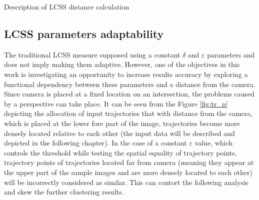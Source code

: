 \begin{algorithm}[!htb]
	\caption{Description of LCSS distance calculation}
	\label{algo:lcss-descr}
	\SetAlgoLined
\end{algorithm}

\subsection{LCSS parameters adaptability}

The traditional LCSS measure supposed using a constant $\delta$ and $\varepsilon$ parameters and does not imply making them adaptive. However, one of the objectives in this work is investigating an opportunity to increase results accuracy by exploring a functional dependency between these parameters and a distance from the camera. Since camera is placed at a fixed location on an intersection, the problems caused by a perspective can take place. It can be seen from the Figure \ref{fig:tr_p} depicting the allocation of input trajectories that with distance from the camera, which is placed at the lower fore part of the image, trajectories become more densely located relative to each other (the input data will be described and depicted in the following chapter). In the case of a constant $\varepsilon$ value, which controls the threshold while testing the spatial equality of trajectory points, trajectory points of trajectories located far from camera (meaning they appear at the upper part of the sample images and are more densely located to each other) will be incorrectly considered as similar. This can contort the following analysis and skew the further clustering results.

